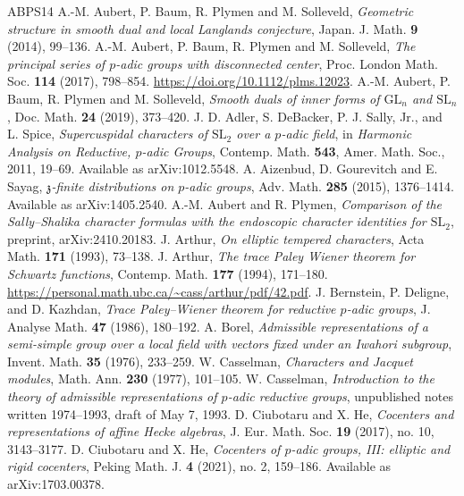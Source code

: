 \documentclass[12pt,letterpaper]{amsart}
\numberwithin{equation}{section}
\theoremstyle{definition}
\theoremstyle{remark}
\begin{document}
\begin{thebibliography}{ABPS14}
 A.-M. Aubert, P. Baum, R. Plymen and M. Solleveld, \emph{Geometric structure in smooth dual and local Langlands conjecture}, Japan. J. Math. \textbf{9} (2014), 99--136.
 A.-M. Aubert, P. Baum, R. Plymen and M. Solleveld, \emph{The principal series of $p$-adic groups with disconnected center}, Proc. London Math. Soc. \textbf{114} (2017), 798--854. \url{https://doi.org/10.1112/plms.12023}.
 A.-M. Aubert, P. Baum, R. Plymen and M. Solleveld, \emph{Smooth duals of inner forms of $\mathrm{GL}_n$ and $\mathrm{SL}_n$}, Doc. Math. \textbf{24} (2019), 373--420.
 J. D. Adler, S. DeBacker, P. J. Sally, Jr., and L. Spice, \emph{Supercuspidal characters of $\mathrm{SL}_2$ over a $p$-adic field}, in \emph{Harmonic Analysis on Reductive, $p$-adic Groups}, Contemp. Math. \textbf{543}, Amer. Math. Soc., 2011, 19--69. Available as arXiv:1012.5548.
 A. Aizenbud, D. Gourevitch and E. Sayag, \emph{$\mathfrak z$-finite distributions on $p$-adic groups}, Adv. Math. \textbf{285} (2015), 1376--1414. Available as arXiv:1405.2540.
 A.-M. Aubert and R. Plymen, \emph{Comparison of the Sally--Shalika character formulas with the endoscopic character identities for $\mathrm{SL}_2$}, preprint, arXiv:2410.20183.
 J. Arthur, \emph{On elliptic tempered characters}, Acta Math. \textbf{171} (1993), 73--138.
 J. Arthur, \emph{The trace Paley Wiener theorem for Schwartz functions}, Contemp. Math. \textbf{177} (1994), 171--180. \url{https://personal.math.ubc.ca/~cass/arthur/pdf/42.pdf}.
 J. Bernstein, P. Deligne, and D. Kazhdan, \emph{Trace Paley--Wiener theorem for reductive $p$-adic groups}, J. Analyse Math. \textbf{47} (1986), 180--192.
 A. Borel, \emph{Admissible representations of a semi-simple group over a local field with vectors fixed under an Iwahori subgroup}, Invent. Math. \textbf{35} (1976), 233--259.
 W. Casselman, \emph{Characters and Jacquet modules}, Math. Ann. \textbf{230} (1977), 101--105.
 W. Casselman, \emph{Introduction to the theory of admissible representations of $p$-adic reductive groups}, unpublished notes written 1974--1993, draft of May 7, 1993.
 D. Ciubotaru and X. He, \emph{Cocenters and representations of affine Hecke algebras}, J. Eur. Math. Soc. \textbf{19} (2017), no. 10, 3143--3177.
 D. Ciubotaru and X. He, \emph{Cocenters of $p$-adic groups, III: elliptic and rigid cocenters}, Peking Math. J. \textbf{4} (2021), no. 2, 159--186. Available as arXiv:1703.00378.

\end{thebibliography}
\end{document}
